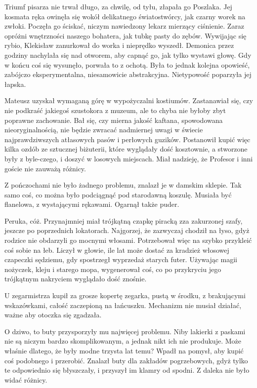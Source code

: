 Triumf pisarza nie trwał długo, za chwilę, od tyłu, złapała go Poszlaka.
Jej kosmata ręka owinęła się wokół delikatnego światostwórcy, jak czarny worek na zwłoki.
Poczęła go ściskać, niczym nawiedzony lekarz mierzący ciśnienie.
Zaraz opróżni wnętrzności naszego bohatera, jak tubkę pasty do zębów.
Wywijając się rybio, Klekisław zanurkował do worka i nieprędko wyszedł.
Demonica przez godziny nachylała się nad otworem, aby capnąć go, jak tylko wystawi głowę.
Gdy w końcu coś się wysunęło, porwała to z ochotą.
Była to jednak kolejna opowieść, zabójczo eksperymentalna, niesamowicie abstrakcyjna.
Nietypowość poparzyła jej łapska.

\divider{}

Mateusz uzyskał wymaganą górę w wypożyczalni kostiumów.
Zastanawiał się, czy nie podkraść jakiegoś szustokora z muzeum, ale to chyba nie byłoby zbyt poprawne zachowanie.
Bał się, czy mierna jakość kaftana, spowodowana nieoryginalnością, nie będzie zwracać nadmiernej uwagi w świecie najprawdziwszych atłasowych pasów i perłowych guzików.
Postanowił kupić więc kilka ozdób ze sztucznej biżuterii, które wyglądały dość kosztownie, a stworzone były z byle-czego, i doszyć w losowych miejscach. 
Miał nadzieję, że Profesor i inni goście nie zauważą różnicy.

Z pończochami nie było żadnego problemu, znalazł je w damskim sklepie.
Tak samo coś, co można było podciągnąć pod starodawną koszulę.
Musiała być flanelowa, z wystającymi rękawami.
Ogarnął także puder.

Peruka, cóż. Przynajmniej miał trójkątną czapkę piracką zza zakurzonej szafy, jeszcze po poprzednich lokatorach.
Najgorzej, że zazwyczaj chodził na łyso, gdyż rodzice nie obdarzyli go mocnymi włosami.
Potrzebował więc na szybko przykleić coś sobie na łeb.
Liczył w głowie, ile lat może dostać za kradzież włosowej czapeczki sędziemu, gdy spostrzegł wyprzedaż starych futer.
Używając magii nożyczek, kleju i starego mopa, wygenerował coś, co po przykryciu jego trójkątnym nakryciem wyglądało dość znośnie.

U zegarmistrza kupił za grosze kopertę zegarka, pustą w środku, z brakującymi wskazówkami, całość zaczepioną na łańcuszku.
Mechanizm nie musiał działać, ważne aby otoczka się zgadzała.

O dziwo, to buty przysporzyły mu najwięcej problemu.
Niby lakierki z paskami nie są niczym bardzo skomplikowanym, a jednak nikt ich nie produkuje.
Może właśnie dlatego, że były modne trzysta lat temu?
Wpadł na pomysł, aby kupić coś podobnego i przerobić.
Znalazł buty dla zakładów pogrzebowych, gdyż tylko te odpowiednio się błyszczały, i przyszył im klamry od spodni.
Z daleka nie było widać różnicy.

